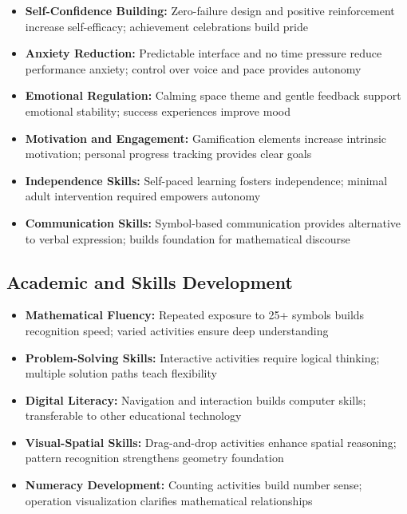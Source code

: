 \documentclass[12pt, a4paper]{article}
\begin{document}
\begin{itemize}[leftmargin=*, itemsep=8pt]
    \item \textbf{Self-Confidence Building:} Zero-failure design and positive reinforcement increase self-efficacy; achievement celebrations build pride
    
    \item \textbf{Anxiety Reduction:} Predictable interface and no time pressure reduce performance anxiety; control over voice and pace provides autonomy
    
    \item \textbf{Emotional Regulation:} Calming space theme and gentle feedback support emotional stability; success experiences improve mood
    
    \item \textbf{Motivation and Engagement:} Gamification elements increase intrinsic motivation; personal progress tracking provides clear goals
    
    \item \textbf{Independence Skills:} Self-paced learning fosters independence; minimal adult intervention required empowers autonomy
    
    \item \textbf{Communication Skills:} Symbol-based communication provides alternative to verbal expression; builds foundation for mathematical discourse
\end{itemize}

\subsection{Academic and Skills Development}

\begin{itemize}[leftmargin=*, itemsep=8pt]
    \item \textbf{Mathematical Fluency:} Repeated exposure to 25+ symbols builds recognition speed; varied activities ensure deep understanding
    
    \item \textbf{Problem-Solving Skills:} Interactive activities require logical thinking; multiple solution paths teach flexibility
    
    \item \textbf{Digital Literacy:} Navigation and interaction builds computer skills; transferable to other educational technology
    
    \item \textbf{Visual-Spatial Skills:} Drag-and-drop activities enhance spatial reasoning; pattern recognition strengthens geometry foundation
    
    \item \textbf{Numeracy Development:} Counting activities build number sense; operation visualization clarifies mathematical relationships
\end{itemize}
\end{document}
